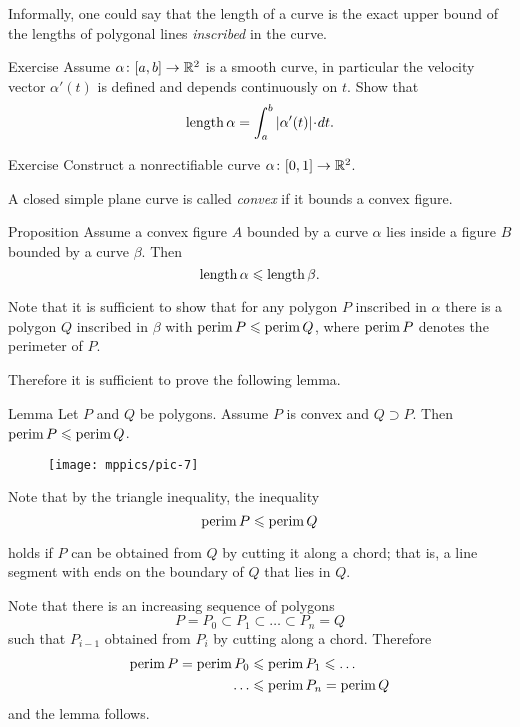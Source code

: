 Informally, one could say that the length of a curve is the exact upper bound of the lengths of polygonal lines \emph{inscribed} in the curve.

\begin{thm}{Exercise}
Assume $\alpha\colon[a,b]\to\mathbb{R}^2$ is a smooth curve, in particular the velocity vector $\alpha'(t)$ is defined and depends continuously on $t$.
Show that
\[\length \alpha=\int_a^b|\alpha'(t)|\cdot dt.\]
\end{thm}

\begin{thm}{Exercise}\label{ex:nonrectifiable-curve}
Construct a nonrectifiable curve $\alpha\colon[0,1]\to\mathbb{R}^2$.
\end{thm}

A closed simple plane curve is called \emph{convex} if it bounds a convex figure.

\begin{thm}{Proposition}\label{prop:convex-curve}
Assume a convex figure $A$ bounded by a curve $\alpha$ lies inside a figure $B$ bounded by a curve $\beta$.
Then
\[\mathop{\rm length}\nolimits\alpha\leqslant \mathop{\rm length}\nolimits\beta.\]
\end{thm}

Note that it is sufficient to show that for any polygon  $P$ inscribed in $\alpha$ there is a polygon $Q$ inscribed in $\beta$ with 
$\mathop{\rm perim}\nolimits P\leqslant \mathop{\rm perim}\nolimits Q$, where $\mathop{\rm perim}\nolimits P$ denotes the perimeter of $P$.

Therefore it is sufficient to prove the following lemma.


\begin{thm}{Lemma}\label{lem:perimeter}
Let $P$ and $Q$ be polygons.
Assume $P$ is convex and $Q\supset P$.
Then $\mathop{\rm perim}\nolimits P\leqslant \mathop{\rm perim}\nolimits Q$.
\end{thm}


\begin{wrapfigure}{r}{24 mm}
\vskip-4mm
\centering
\texttt{[image: mppics/pic-7]}
\end{wrapfigure}

Note that by the triangle inequality,
the inequality
\[\mathop{\rm perim}\nolimits P\leqslant \mathop{\rm perim}\nolimits Q\]

holds
if $P$ can be obtained from $Q$ by cutting it along a chord;
that is, a line segment with ends on the boundary of $Q$ that lies in $Q$.


Note that there is an increasing sequence of polygons 
$$P=P_0\subset P_1\subset\dots\subset P_n=Q$$
such that $P_{i-1}$ obtained from $P_{i}$ by cutting along a chord.
Therefore 
\begin{align*}
\mathop{\rm perim}\nolimits P=\mathop{\rm perim}\nolimits P_0&\leqslant\mathop{\rm perim}\nolimits P_1\leqslant\dots
\\
\dots&\leqslant\mathop{\rm perim}\nolimits P_n=\mathop{\rm perim}\nolimits Q
\end{align*}
and the lemma follows.
\qeds

